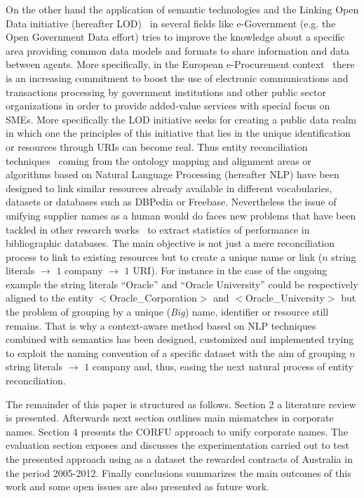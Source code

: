 \documentclass{llncs}
\begin{document}
On the other hand the application of semantic technologies and the Linking Open Data initiative (hereafter LOD)~\cite{Berners-Lee-2006,Heath_Bizer_2011}  
in several fields like e-Government (e.g. the Open Government Data effort) tries to improve the knowledge about a specific area providing 
common data models and formats to share information and data between agents. More specifically, in the European e-Procurement 
context~\cite{e-Proc-map-paper} there is an increasing commitment to boost the use of electronic communications and transactions 
processing by government institutions and other public sector organizations in order to provide added-value services with special focus on SMEs. 
More specifically the LOD initiative seeks for creating a public data realm in which one the principles of this initiative that lies in the 
unique identification or resources through URIs can become real. Thus entity reconciliation techniques~\cite{Serimi,conf/www/MaaliCP11} 
coming from the ontology mapping and alignment areas or algorithms based on Natural Language Processing (hereafter NLP) have been 
designed to link similar resources already available in different vocabularies, datasets or databases such as DBPedia or Freebase. 
Nevertheless the issue of unifying supplier names as a human would do faces new problems that have been tackled in 
other research works~\cite{Galvez2006} to extract statistics of performance in bibliographic databases. The main objective is not just a 
mere reconciliation process to link to existing resources but to create a unique name or link ($n$ string literals $\to$ $1$ company $\to$ $1$ URI). 
For instance in the case of the ongoing example the string literals ``Oracle'' and ``Oracle University'' could be respectively aligned to the entity $<$Oracle\_Corporation$>$ and $<$Oracle\_University$>$ but 
the problem of grouping by a unique (\textit{Big}) name, identifier or resource still remains. That is why a context-aware method based on NLP 
techniques combined with semantics has been designed, customized and implemented trying to exploit the naming convention of a specific dataset with the aim 
of grouping $n$ string literals $\to$ $1$ company and, thus, easing the next natural process of entity reconciliation.

The remainder of this paper is structured as follows. Section 2 a literature review is presented. Afterwards next section outlines main mismatches in corporate names. Section 4 presents 
the CORFU approach to unify corporate names. The evaluation section exposes and discusses the experimentation carried out to test the presented approach using as a dataset the rewarded 
contracts of Australia in the period 2005-2012. Finally conclusions summarizes the main outcomes of this work 
and some open issues are also presented as future work.
\end{document}
